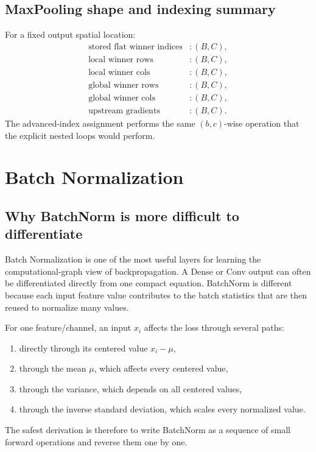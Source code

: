 \documentclass[11pt,a4paper]{article}
\begin{document}
\subsection{MaxPooling shape and indexing summary}

For a fixed output spatial location:
\begin{align*}
\text{stored flat winner indices} &: (B,C),\\
\text{local winner rows} &: (B,C),\\
\text{local winner cols} &: (B,C),\\
\text{global winner rows} &: (B,C),\\
\text{global winner cols} &: (B,C),\\
\text{upstream gradients} &: (B,C).
\end{align*}
The advanced-index assignment performs the same $(b,c)$-wise operation that the explicit nested loops would perform.

\newpage
\section{Batch Normalization}

\subsection{Why BatchNorm is more difficult to differentiate}

Batch Normalization is one of the most useful layers for learning the computational-graph view of backpropagation. A Dense or Conv output can often be differentiated directly from one compact equation. BatchNorm is different because each input feature value contributes to the batch statistics that are then reused to normalize many values.

For one feature/channel, an input $x_i$ affects the loss through several paths:
\begin{enumerate}[leftmargin=2em]
    \item directly through its centered value $x_i-\mu$,
    \item through the mean $\mu$, which affects every centered value,
    \item through the variance, which depends on all centered values,
    \item through the inverse standard deviation, which scales every normalized value.
\end{enumerate}

The safest derivation is therefore to write BatchNorm as a sequence of small forward operations and reverse them one by one.
\end{document}
